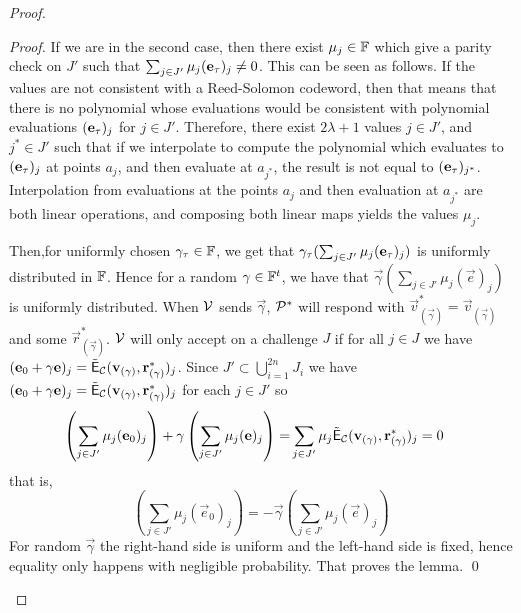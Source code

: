 \begin{proof}
\begin{proof}
If we are in the second case, then there exist $\mu_j \in \mathbb{F}$ which give a parity check on $J'$ such that $\sum_{j \in J'} \mu_j (\mathbf{e}_{\tau})_j \neq 0$. This can be seen as follows. If the values are not consistent with a Reed-Solomon codeword, then that means that there is no polynomial whose evaluations would be consistent with polynomial evaluations $(\mathbf{e}_{\tau})_j$ for $j \in J'$. Therefore, there exist $2\lambda+1$ values $j \in J'$, and $j^* \in J'$ such that if we interpolate to compute the polynomial which evaluates to $(\mathbf{e}_{\tau})_j$ at points $a_j$, and then evaluate at $a_{j^*}$, the result is not equal to $(\mathbf{e}_{\tau})_{j^*}$. Interpolation from evaluations at the points $a_j$ and then evaluation at $a_{j^*}$ are both linear operations, and composing both linear maps yields the values $\mu_j$.

Then,for uniformly chosen $\mathbf{\gamma}_\tau\in \mathbb{F}$, we get that $\mathbf{\gamma}_\tau(\sum_{j \in J'} \mu_j (\mathbf{e}_{\tau})_j)$ is uniformly distributed in $\mathbb{F}$. Hence for a random $\mathbf{\gamma}\in\mathbb{F}^t$, we have that $\vec{\gamma} (\sum_{j \in J'} \mu_j (\vec{e})_j)$ is uniformly distributed. When $\mathcal{V}$ sends $\vec{\gamma}$, $\mathcal{P}^*$ will respond with $\vec{v}^*_{(\vec{\gamma})}=\vec{v}_{(\vec{\gamma})}$ and some $\vec{r}^*_{(\vec{\gamma})}$. 
$\mathcal{V}$ will only accept on a challenge $J$ if for all $j\in J$ we have $(\mathbf{e}_0+\mathbf{\gamma}\mathbf{e})_j=\tilde{\mathsf{E}}_{\mathcal{C}}(\mathbf{v}_{(\mathbf{\gamma})},\mathbf{r}^*_{(\mathbf{\gamma})})_j$. 
Since $J' \subset \bigcup_{i=1}^{2n} J_i$ we have $(\mathbf{e}_0+\mathbf{\gamma}\mathbf{e})_j=\tilde{\mathsf{E}}_{\mathcal{C}}(\mathbf{v}_{(\mathbf{\gamma})},\mathbf{r}^*_{(\mathbf{\gamma})})_j$ for each $j \in J'$ so 
\begin{align*}
\left(\sum_{j \in J'} \mu_j (\vec{e}_0)_j\right) + \vec{\gamma} \left(\sum_{j \in J'} \mu_j (\vec{e})_j \right) = 
%
& \sum_{j \in J'} \mu_j \ECC(\vec{v}_{(\vec{\gamma})},\vec{r}^*_{(\vec{\gamma})})_j = 0
\end{align*}
that is, 
\[\left(\sum_{j \in J'} \mu_j (\vec{e}_0)_j\right) = -\vec{\gamma} \left(\sum_{j \in J'} \mu_j (\vec{e})_j \right)\]
For random $\vec{\gamma}$ the right-hand side is uniform and the left-hand side is fixed, hence equality only happens with negligible probability. That proves the lemma. \qed
\end{proof}
\end{proof}


